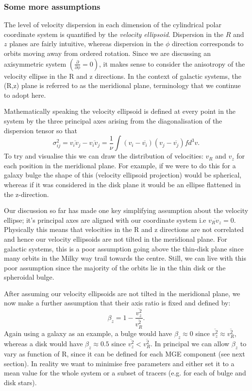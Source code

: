 \subsubsection{Some more assumptions}
The level of velocity dispersion in each dimension of the cylindrical polar coordinate system is quantified by the \textit{velocity ellipsoid}. Dispersion in the $R$ and $z$ planes are fairly intuitive, whereas dispersion in the $\phi$ direction corresponds to orbits moving away from ordered rotation. Since we are discussing an axisymmetric system $(\frac{\partial }{\partial \phi} = 0)$, it makes sense to consider the anisotropy of the velocity ellipse in the R and z directions. In the context of galactic systems, the (R,z) plane is referred to as the meridional plane, terminology that we continue to adopt here.

Mathematically speaking the velocity ellipsoid is defined at every point in the system by the three principal axes arising from the diagonalisation of the dispersion tensor so that
\begin{equation}
\sigma_{ij}^{2} = \overline{v_i v_j} - \overline{v_i v_j} = \frac{1}{\nu} \int (v_i - \overline{v_i})(v_j - \overline{v_j}) f d^3 v.
\end{equation}
To try and visualise this we can draw the distribution of velocities: $v_R$ and $v_z$ for each position in the meridional plane. For example, if we were to do this for a galaxy bulge the shape of this (velocity ellipsoid projection) would be spherical, whereas if it was considered in the disk plane it would be an ellipse flattened in the z-direction. 

Our discussion so far has made one key simplifying assumption about the velocity ellipse; it's principal axes are aligned with our coordinate system i.e $\overline{v_R v_z} = 0$. Physically this means that velocities in the R and z directions are not correlated and hence our velocity ellipsoids are not tilted in the meridional plane. For galactic systems, this is a poor assumption going above the thin-disk plane since many orbits in the Milky way trail towards the centre. Still, we can live with this poor assumption since the majority of the orbits lie in the thin disk or the spheroidal bulge. 

After assuming our velocity ellipsoids are not tilted in the meridional plane, we now make a further assumption that their axis ratio is fixed and defined by:
\begin{equation} \label{beta_z}
\beta_z = 1 - \frac{\overline{v_{z}^2}}{\overline{v_{R}^2}}.
\end{equation}
Again using a galaxy as an example, a bulge would have $\beta_z \approx 0$ since $\overline{v_z^2} \approx \overline{v_R^2}$, whereas a disk would have $\beta_z \approx 0.5$ since $\overline{v_z^2} < \overline{v_R^2}$. In principal we can allow $\beta_z$ to vary as function of R, since it can be defined for each MGE component (see next section). In reality we want to minimise free parameters and either set it to a mean value for the whole system or a subset of tracers (e.g. for each of bulge and disk stars). 

